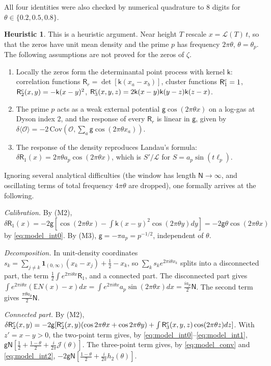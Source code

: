 \documentclass[11pt,reqno]{amsart}
\numberwithin{equation}{section}
\theoremstyle{plain}
\theoremstyle{definition}
\newtheorem{heuristic}[theorem]{Heuristic}
\theoremstyle{remark}
\newcommand{\lL}{\mathcal L}
\newcommand{\sk}{\mathsf k}
\begin{document}
All four identities were also checked by numerical quadrature to $8$ digits for $\theta\in\{0.2,0.5,0.8\}$.

\begin{heuristic}\label{heur:model}
This is a heuristic argument. Near height $T$ rescale $x=\lL(T)\,t$, so that the zeros have unit mean density and the prime $p$ has frequency $2\pi\theta$, $\theta=\theta_p$. The following assumptions are not proved for the zeros of $\zeta$.
\begin{enumerate}[label=(M\arabic*),leftmargin=2.6em]
\item Locally the zeros form the determinantal point process with kernel $\sk$: correlation functions $\mathsf R_r=\det[\sk(x_a-x_b)]$, cluster functions $\mathsf R^{\rm c}_1=1$, $\mathsf R^{\rm c}_2(x,y)=-\sk(x-y)^2$, $\mathsf R^{\rm c}_3(x,y,z)=2\sk(x-y)\sk(y-z)\sk(z-x)$.
\item The prime $p$ acts as a weak external potential $\mathsf g\cos(2\pi\theta x)$ on a log-gas at Dyson index $2$, and the response of every $\mathsf R_r$ is linear in $\mathsf g$, given by $\delta\langle\mathcal O\rangle=-2\,\mathrm{Cov}(\mathcal O,\sum_a\mathsf g\cos(2\pi\theta x_a))$.
\item The response of the density reproduces Landau's formula: $\delta\mathsf R_1(x)=2\pi\theta a_p\cos(2\pi\theta x)$, which is $S'/\lL$ for $S=a_p\sin(t\ell_p)$.
\end{enumerate}
Ignoring several analytical difficulties (the window has length $\mathsf N\to\infty$, and oscillating terms of total frequency $4\pi\theta$ are dropped), one formally arrives at the following.

\emph{Calibration.} By (M2), $\delta\mathsf R_1(x)=-2\mathsf g[\cos(2\pi\theta x)-\int\sk(x-y)^2\cos(2\pi\theta y)dy]=-2\mathsf g\theta\cos(2\pi\theta x)$ by \eqref{eq:model_int0}. By (M3), $\mathsf g=-\pi a_p=p^{-1/2}$, independent of $\theta$.

\emph{Decomposition.} In unit-density coordinates $s_k=\sum_{j\ne k}\mathbf 1_{(0,\infty)}(x_k-x_j)+\frac12-x_k$, so $\sum_ks_ke^{2\pi i\theta x_k}$ splits into a disconnected part, the term $\frac12\int e^{2\pi i\theta x}\mathsf R_1$, and a connected part. The disconnected part gives $\int e^{2\pi i\theta x}(\mathbb E N(x)-x)dx=\int e^{2\pi i\theta x}a_p\sin(2\pi\theta x)dx=\frac{ia_p}2\mathsf N$. The second term gives $\frac{\pi\theta a_p}2\mathsf N$.

\emph{Connected part.} By (M2), $\delta\mathsf R^{\rm c}_2(x,y)=-2\mathsf g[\mathsf R^{\rm c}_2(x,y)(\cos2\pi\theta x+\cos2\pi\theta y)+\int\mathsf R^{\rm c}_3(x,y,z)\cos(2\pi\theta z)dz]$. With $z'=x-y>0$, the two-point term gives, by \eqref{eq:model_int0}--\eqref{eq:model_int1}, $\mathsf g\mathsf N[\frac12+\frac{1-\theta}2+\frac i{2\pi}\mathcal J(\theta)]$. The three-point term gives, by \eqref{eq:model_conv} and \eqref{eq:model_int2}, $-2\mathsf g\mathsf N[\frac{1-\theta}2+\frac i{2\pi}h_2(\theta)]$.


\end{heuristic}
\end{document}
